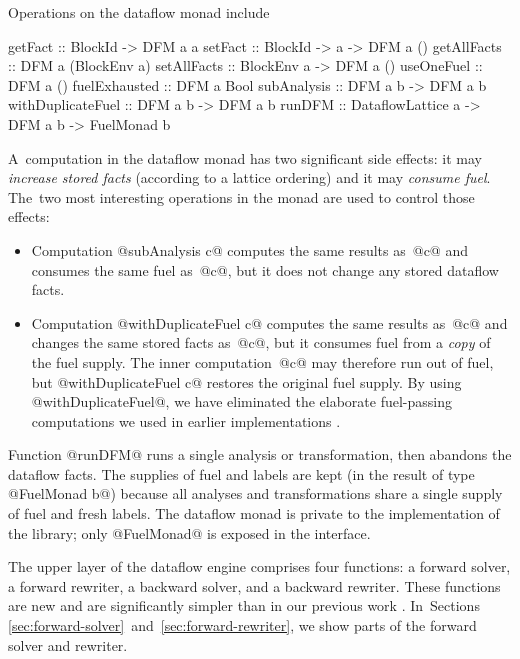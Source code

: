 \documentclass[blockstyle,preprint,natbib,nocopyrightspace]{sigplanconf}
\let\cite\citep
\def\authornote#1{\unskip\relax}
\newcommand{\john}[1]{\authornote{JD: #1}}
\newcommand\secreftwo[2]{Sections \ref{sec:#1}~and~\ref{sec:#2}}
\begin{document}
Operations on the dataflow monad include
\begin{code}
getFact           :: BlockId -> DFM a a
setFact           :: BlockId -> a -> DFM a ()
getAllFacts       :: DFM a (BlockEnv a)
setAllFacts       :: BlockEnv a -> DFM a ()
useOneFuel        :: DFM a ()
fuelExhausted     :: DFM a Bool
subAnalysis       :: DFM a b -> DFM a b
withDuplicateFuel :: DFM a b -> DFM a b
runDFM :: DataflowLattice a -> DFM a b -> FuelMonad b
\end{code}
A~computation in the dataflow monad has two significant side effects:
it may \emph{increase stored facts} (according to a lattice ordering)
and it may \emph{consume fuel}.
The~two most interesting operations in the monad are used to control
those effects:
\begin{itemize}
\item
Computation @subAnalysis c@ computes the same results as~@c@ and
consumes the same fuel as~@c@, but it does not change any stored
dataflow facts.
\item
Computation @withDuplicateFuel c@ computes the same results as~@c@ and
changes the same stored facts as~@c@, but it consumes fuel from a
\emph{copy} of the fuel supply.
The inner computation~@c@ may therefore run out of fuel, but
@withDuplicateFuel c@ restores the original fuel supply.
By using @withDuplicateFuel@, we have eliminated the elaborate
fuel-passing computations we used in earlier implementations
\cite{ramsey-dias:applicative-flow-graph}. 
\end{itemize}
Function @runDFM@ runs a single analysis or transformation, then
abandons the dataflow facts.
The supplies of fuel and labels are kept (in the result of type
@FuelMonad b@) because all analyses and transformations share a single
supply of fuel and fresh labels.
%
The dataflow monad is private to the
implementation of the library; 
only @FuelMonad@ is exposed in the interface.

The upper layer of the dataflow engine comprises four functions:
a forward solver, a forward rewriter,
a backward solver, and a backward rewriter.
These functions are new and are significantly simpler than in our
previous work \cite{ramsey-dias:applicative-flow-graph}.
In~\secreftwo{forward-solver}{forward-rewriter},
we show parts of the forward solver and rewriter. 
\end{document}
